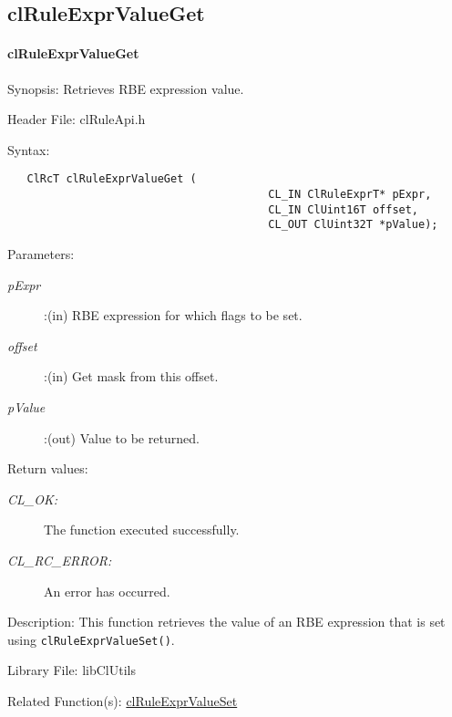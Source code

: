 \begin{flushleft}
\subsection{clRuleExprValueGet}
\hypertarget{pagerule116}{}\paragraph{cl\-Rule\-Expr\-Value\-Get}\label{pagerule116}
\begin{Desc}
\item[Synopsis:]Retrieves RBE expression value.\end{Desc}
\begin{Desc}
\item[Header File:]clRuleApi.h\end{Desc}
\begin{Desc}
\item[Syntax:]

\footnotesize\begin{verbatim}   ClRcT clRuleExprValueGet (
                              			CL_IN ClRuleExprT* pExpr,
                              			CL_IN ClUint16T offset,
                              			CL_OUT ClUint32T *pValue);
\end{verbatim}
\normalsize
\end{Desc}
\begin{Desc}
\item[Parameters:]
\begin{description}
\item[{\em p\-Expr}]:(in) RBE expression for which flags to be set. 
\item[{\em offset}]:(in) Get mask from this offset. 
\item[{\em p\-Value}]:(out) Value to be returned.\end{description}
\end{Desc}
\begin{Desc}
\item[Return values:]
\begin{description}
\item[{\em CL\_\-OK:}]The function executed successfully. \item[{\em CL\_\-RC\_\-ERROR:}]An error has occurred.\end{description}
\end{Desc}
\begin{Desc}
\item[Description:]This function retrieves the value of an RBE expression that is set using {\tt{clRuleExprValueSet()}}.\end{Desc}
\begin{Desc}
\item[Library File:]lib\-Cl\-Utils\end{Desc}
\begin{Desc}
\item[Related Function(s):]\hyperlink{pagerule116}{cl\-Rule\-Expr\-Value\-Set} \end{Desc}
\newpage



\end{flushleft}
